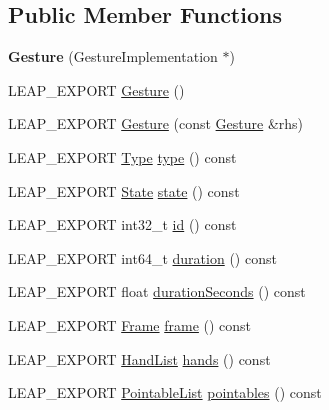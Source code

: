 \subsection*{Public Member Functions}
\begin{DoxyCompactItemize}
\item 
\hypertarget{class_leap_1_1_gesture_a5050476dcb08d43618d82aabdf8d95f3}{{\bfseries Gesture} (Gesture\+Implementation $\ast$)}\label{class_leap_1_1_gesture_a5050476dcb08d43618d82aabdf8d95f3}

\item 
L\+E\+A\+P\+\_\+\+E\+X\+P\+O\+R\+T \hyperlink{class_leap_1_1_gesture_a703b6671d33d74dd5669b38e9c2edb15}{Gesture} ()
\item 
L\+E\+A\+P\+\_\+\+E\+X\+P\+O\+R\+T \hyperlink{class_leap_1_1_gesture_a958edec008098eabcd1dc93208136c5f}{Gesture} (const \hyperlink{class_leap_1_1_gesture}{Gesture} \&rhs)
\item 
L\+E\+A\+P\+\_\+\+E\+X\+P\+O\+R\+T \hyperlink{class_leap_1_1_gesture_a6fa6dd4f28c502f0d55abc6b71c6f9b1}{Type} \hyperlink{class_leap_1_1_gesture_a961ded36b3f4f72eff342283808c70d5}{type} () const 
\item 
L\+E\+A\+P\+\_\+\+E\+X\+P\+O\+R\+T \hyperlink{class_leap_1_1_gesture_a068c6f3ba05970dc557b62a366073578}{State} \hyperlink{class_leap_1_1_gesture_ae4e9f9b9fcbbe4b8a165009596efa8a0}{state} () const 
\item 
L\+E\+A\+P\+\_\+\+E\+X\+P\+O\+R\+T int32\+\_\+t \hyperlink{class_leap_1_1_gesture_acac877f9c2803f7d7d03107be9348471}{id} () const 
\item 
L\+E\+A\+P\+\_\+\+E\+X\+P\+O\+R\+T int64\+\_\+t \hyperlink{class_leap_1_1_gesture_a9ed79a136da6a2fd65447228274175f3}{duration} () const 
\item 
L\+E\+A\+P\+\_\+\+E\+X\+P\+O\+R\+T float \hyperlink{class_leap_1_1_gesture_a98cf1c2bf86396ec665a652097e61c4f}{duration\+Seconds} () const 
\item 
L\+E\+A\+P\+\_\+\+E\+X\+P\+O\+R\+T \hyperlink{class_leap_1_1_frame}{Frame} \hyperlink{class_leap_1_1_gesture_a44512b16e2d227b9173250c0b1211851}{frame} () const 
\item 
L\+E\+A\+P\+\_\+\+E\+X\+P\+O\+R\+T \hyperlink{class_leap_1_1_hand_list}{Hand\+List} \hyperlink{class_leap_1_1_gesture_a9f8b5383c27efedbc3e47856d865bf21}{hands} () const 
\item 
L\+E\+A\+P\+\_\+\+E\+X\+P\+O\+R\+T \hyperlink{class_leap_1_1_pointable_list}{Pointable\+List} \hyperlink{class_leap_1_1_gesture_a45d8fc212a0b6abfdf05be409b2ba09f}{pointables} () const 

\end{DoxyCompactItemize}
